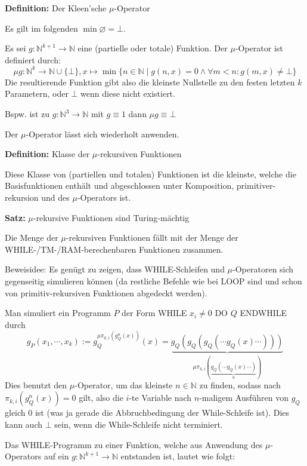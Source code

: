 \documentclass[a4paper,graphics,11pt]{article}
\begin{document}
\strut

\textbf{Definition:} Der Kleen'sche $\mu$-Operator

Es gilt im folgenden $\min \varnothing = \bot$.

Es sei $g: \mathbb{N}^{k+1} \to \mathbb{N}$ eine (partielle oder totale) Funktion.
Der $\mu$-Operator ist definiert durch:
$$
    \mu g : \mathbb{N}^k \to \mathbb{N}\cup\{\bot\},
    x \mapsto \min\{n \in \mathbb{N}\mid g(n,x) = 0 \land \forall m < n: g(m,x) \neq \bot\}
$$
Die resultierende Funktion gibt also die kleinste Nullstelle zu den festen letzten $k$ Parametern,
oder $\bot$ wenn diese nicht existiert.

Bspw. ist zu $g: \mathbb{N}^3 \to \mathbb{N}$ mit $g \equiv 1$ dann $\mu g \equiv \bot$

Der $\mu$-Operator lässt sich wiederholt anwenden.

\strut

\textbf{Definition:} Klasse der $\mu$-rekursiven Funktionen

Diese Klasse von (partiellen und totalen) Funktionen ist die kleinste, welche die Basisfunktionen enthält
und abgeschlossen unter Komposition, primitiver-rekursion und des $\mu$-Operators ist.

\newpage

\textbf{Satz:} $\mu$-rekursive Funktionen sind Turing-mächtig

Die Menge der $\mu$-rekursiven Funktionen fällt mit der Menge der WHILE-/TM-/RAM-berechenbaren Funktionen
zusammen.

Beweisidee: Es genügt zu zeigen, dass WHILE-Schleifen und $\mu$-Operatoren sich gegenseitig simulieren können (da restliche Befehle wie bei LOOP sind und schon von primitiv-rekursiven
Funktionen abgedeckt werden).

Man simuliert ein Programm $P$ der Form WHILE $x_i \neq 0$ DO $Q$ ENDWHILE durch
$$
    g_P(x_1, \cdots, x_k)
    := g_Q^{\mu \pi_{k,i}(g_Q^n(x))}(x)
    = \underbrace{g_Q(g_Q(g_Q(\cdots g_Q(x)\cdots)))}_{\mu \pi_{k,i}(\underbrace{g_Q(\cdots g_Q(x)\cdots)}_{n})}
$$
Dies benutzt den $\mu$-Operator, um das kleinste $n \in \mathbb{N}$ zu finden,
sodass nach $\pi_{k,i}(g_Q^n(x)) = 0$ gilt, also die $i$-te Variable nach $n$-maligem Ausführen von $g_Q$
gleich 0 ist (was ja gerade die Abbruchbedingung der While-Schleife ist). Dies kann auch $\bot$ sein, wenn die While-Schleife nicht terminiert.

Das WHILE-Programm zu einer Funktion,
welche aus Anwendung des $\mu$-Operators auf ein $g: \mathbb{N}^{k+1} \to \mathbb{N}$ entstanden ist,
lautet wie folgt:
\end{document}

